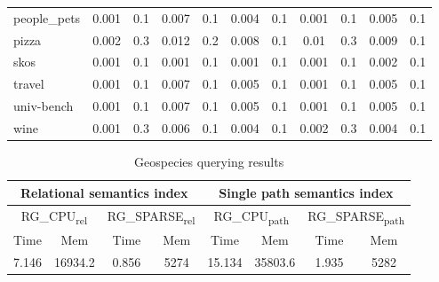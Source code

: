 {\begin{table*}[h]
\begin{tabular}{| l | c  c | c  c | c  c | c  c | c  c |}
people\_pets                & 0.001 & 0.1  & 0.007 & 0.1 & 0.004 & 0.1   & 0.001 & 0.1  & 0.005 & 0.1   \\
pizza                       & 0.002 & 0.3  & 0.012 & 0.2 & 0.008 & 0.1   & 0.01  & 0.3  & 0.009 & 0.1   \\
skos                        & 0.001 & 0.1  & 0.001 & 0.1 & 0.001 & 0.1   & 0.001 & 0.1  & 0.002 & 0.1   \\
travel                      & 0.001 & 0.1  & 0.007 & 0.1 & 0.005 & 0.1   & 0.001 & 0.1  & 0.005 & 0.1   \\
univ-bench                  & 0.001 & 0.1  & 0.007 & 0.1 & 0.005 & 0.1   & 0.001 & 0.1  & 0.005 & 0.1   \\
wine                        & 0.001 & 0.3  & 0.006 & 0.1 & 0.004 & 0.1   & 0.002 & 0.3  & 0.004 & 0.1  \\
    \hline
  \end{tabular}
\end{table*}
}

{\setlength{\tabcolsep}{0.4em}
\begin{table*}[h]
\caption{Geospecies querying results}
\label{tbl:tableGeospeciesResults}
\begin{tabular}{| c  c | c  c | c  c | c  c |}
    \hline

    \multicolumn{4}{|c|}{Relational semantics index}	&	\multicolumn{4}{|c|}{Single path semantics index} \\

    \hline


    \multicolumn{2}{|c|}{RG\_CPU\textsubscript{rel}}	&	\multicolumn{2}{|c|}{RG\_SPARSE\textsubscript{rel}} & \multicolumn{2}{|c|}{RG\_CPU\textsubscript{path}}	&	\multicolumn{2}{|c|}{RG\_SPARSE\textsubscript{path}}	 \\
    \hline
    Time & Mem & Time & Mem & Time & Mem & Time & Mem \\
    \hline
    \hline
    7.146 & 16934.2 & 0.856 & 5274 & 15.134 & 35803.6 & 1.935 & 5282   \\
    \hline
  \end{tabular}
\end{table*}
}

